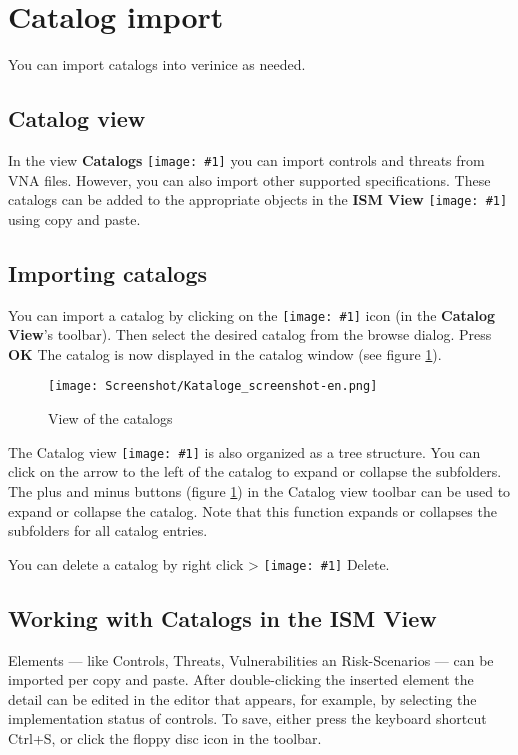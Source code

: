 \documentclass[a4paper,10pt]{book}
\newcommand{\icon}[1]{\texttt{[image: \#1]}}
\begin{document}
\section{Catalog import}
You can import catalogs into verinice as needed.

\subsection{Catalog view}
In the view \textbf{Catalogs} \icon{Icon/bp_catalog} you can import controls
and threats from VNA files. However, you can also import other supported
specifications. These catalogs can be added to the appropriate objects in the
\textbf{ISM View} \icon{Icon/Informationssicherheitsmodell.png} using copy and
paste.

\subsection{Importing catalogs}\label{Importing Catalogs}
You can import a catalog by clicking on the \icon{Icon/Import.png} icon (in the
\textbf{Catalog View}'s toolbar). Then select the desired catalog from the
browse dialog. Press \textbf{OK} The catalog is now displayed in the catalog
window (see figure \ref{View of the catalogs}).

\begin{figure}[htb!]
  \centering
  \texttt{[image: Screenshot/Kataloge\_screenshot-en.png]}
  \caption{\label{View of the catalogs} View of the catalogs}
\end{figure}

The Catalog view \icon{Icon/bp_catalog} is also organized as a tree structure.
You can click on the arrow to the left of the catalog to expand or collapse the
subfolders. The plus and minus buttons (figure \ref{View of the catalogs}) in
the Catalog view toolbar can be used to expand or collapse the catalog. Note
that this function expands or collapses the subfolders for all catalog entries.

You can delete a catalog by right click > \icon{Icon/Delete-Cross} Delete.

\subsection{Working with Catalogs in the ISM View}
Elements --- like Controls, Threats, Vulnerabilities an Risk-Scenarios --- can
be imported per copy and paste.  After double-clicking the inserted element the
detail can be edited in the editor that appears, for example, by selecting the
implementation status of controls. To save, either press the keyboard shortcut
Ctrl+S, or click the floppy disc icon in the toolbar.
\end{document}
